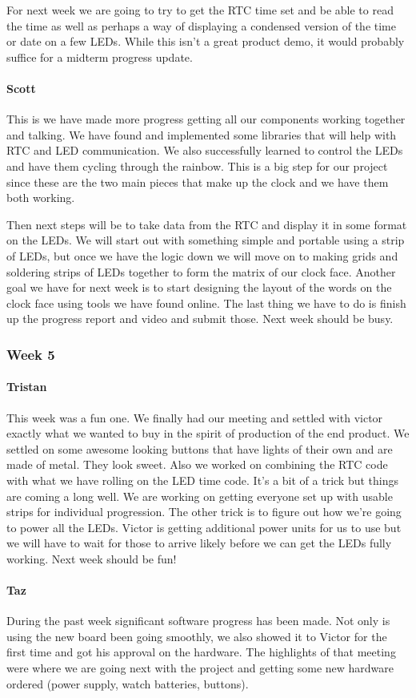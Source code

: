 \documentclass[onecolumn, draftclsnofoot,10pt, compsoc]{IEEEtran}
\begin{document}
For next week we are going to try to get the RTC time set and be able to read the time as well as perhaps a way of displaying a condensed version of the time or date on a few LEDs. While this isn't a great product demo, it would probably suffice for a midterm progress update.
\paragraph{Scott}
This is we have made more progress getting all our components working together and talking. We have found and implemented some libraries that will help with RTC and LED communication. We also successfully learned to control the LEDs and have them cycling through the rainbow. This is a big step for our project since these are the two main pieces that make up the clock and we have them both working.

Then next steps will be to take data from the RTC and display it in some format on the LEDs. We will start out with something simple and portable using a strip of LEDs, but once we have the logic down we will move on to making grids and soldering strips of LEDs together to form the matrix of our clock face. Another goal we have for next week is to start designing the layout of the words on the clock face using tools we have found online. The last thing we have to do is finish up the progress report and video and submit those. Next week should be busy.
\subsubsection{Week 5}
\paragraph{Tristan}
This week was a fun one. We finally had our meeting and settled with victor exactly what we wanted to buy in the spirit of production of the end product. We settled on some awesome looking buttons that have lights of their own and are made of metal. They look sweet. Also we worked on combining the RTC code with what we have rolling on the LED time code. It's a bit of a trick but things are coming a long well. We are working on getting everyone set up with usable strips for individual progression. The other trick is to figure out how we're going to power all the LEDs. Victor is getting additional power units for us to use but we will have to wait for those to arrive likely before we can get the LEDs fully working. Next week should be fun!
\paragraph{Taz}
During the past week significant software progress has been made. Not only is using the new board been going smoothly, we also showed it to Victor for the first time and got his approval on the hardware. The highlights of that meeting were where we are going next with the project and getting some new hardware ordered (power supply, watch batteries, buttons).
\end{document}
